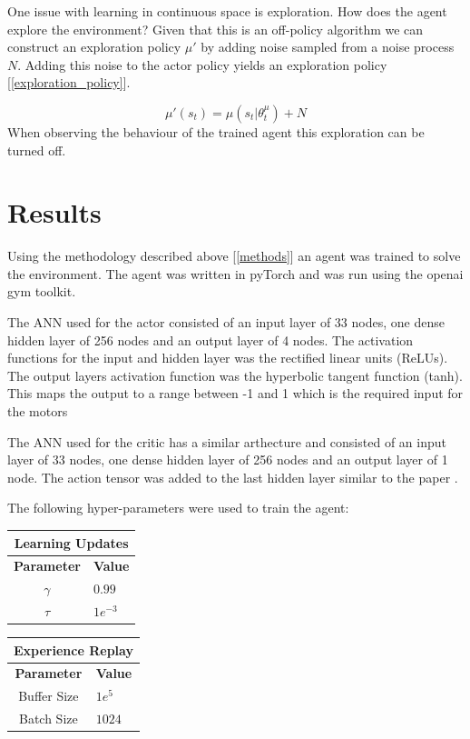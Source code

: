 \documentclass[12pt]{article}
\begin{document}
One issue with learning in continuous space is exploration.
How does the agent explore the environment?
Given that this is an off-policy algorithm we can construct an exploration policy $\mu'$ by adding noise sampled from a noise process $N$.
Adding this noise to the actor policy yields an exploration policy [\ref{exploration_policy}].

\begin{equation}
\label{exploration_policy}
\mu'(s_t) = \mu(s_t|\theta_t^\mu) + N
\end{equation}
When observing the behaviour of the trained agent this exploration can be turned off.

\section{Results}
Using the methodology described above [\ref{methods}] an agent was trained to solve the environment.
The agent was written in pyTorch and was run using the openai gym toolkit.

The ANN used for the actor consisted of an input layer of 33 nodes, one dense hidden layer of 256 nodes and an output layer of 4 nodes.
The activation functions for the input and hidden layer was the rectified linear units (ReLUs). 
The output layers activation function was the hyperbolic tangent function (tanh). 
This maps the output to a range between -1 and 1 which is the required input for the motors

The ANN used for the critic has a similar arthecture and consisted of an input layer of 33 nodes, one dense hidden layer of 256 nodes and an output layer of 1 node. The action tensor was added to the last hidden layer similar to the paper \cite{ddpg_paper}.

The following hyper-parameters were used to train the agent:

\begin{table}[h!t]
\begin{minipage}{.5\linewidth}
\begin{tabular}{|c|l|}
	\hline
	\multicolumn{2}{|c|}{\textbf{Learning Updates}}\\
	\hline
	\hline
	\textbf{Parameter} & \textbf{Value}\\
	\hline
	$\gamma$ & $0.99$\\
	$\tau$ & $1e^{-3}$\\
	\hline
\end{tabular}
\end{minipage}
\begin{minipage}{.5\linewidth}
\begin{tabular}{|c|l|}
	\hline
	\multicolumn{2}{|c|}{\textbf{Experience Replay}}\\
	\hline
	\hline
	\textbf{Parameter} & \textbf{Value}\\
	\hline
	Buffer Size & $1e^{5}$\\
	Batch Size & $1024$\\
	\hline
\end{tabular}
\end{minipage}
\end{table}
\end{document}
